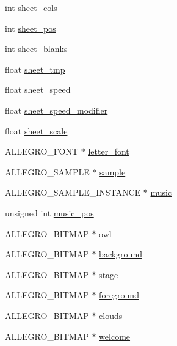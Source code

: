 \begin{DoxyCompactItemize}
\item 
int \hyperlink{structLevel_a8a5c443169a4ff15f330a65473eedb1b}{sheet\-\_\-cols}
\item 
int \hyperlink{structLevel_a21c699af201ffe60ccd1319b3f540947}{sheet\-\_\-pos}
\item 
int \hyperlink{structLevel_aebaaba311e5d4842fdbd8c50edd40808}{sheet\-\_\-blanks}
\item 
float \hyperlink{structLevel_a22e80ea91fd267dae85c0457e581d072}{sheet\-\_\-tmp}
\item 
float \hyperlink{structLevel_a41db1345ac158898450907010a49748f}{sheet\-\_\-speed}
\item 
float \hyperlink{structLevel_a3cae10fd441bcc14b6a47dd5fedafa59}{sheet\-\_\-speed\-\_\-modifier}
\item 
float \hyperlink{structLevel_a267a140bd3de1fc3f23a88623de425ed}{sheet\-\_\-scale}
\item 
A\-L\-L\-E\-G\-R\-O\-\_\-\-F\-O\-N\-T $\ast$ \hyperlink{structLevel_a69e6eae14648fd488a1dec0f55e4d293}{letter\-\_\-font}
\item 
A\-L\-L\-E\-G\-R\-O\-\_\-\-S\-A\-M\-P\-L\-E $\ast$ \hyperlink{structLevel_a234fa7b9ec35dd360e4e3c48a944fc7d}{sample}
\item 
A\-L\-L\-E\-G\-R\-O\-\_\-\-S\-A\-M\-P\-L\-E\-\_\-\-I\-N\-S\-T\-A\-N\-C\-E $\ast$ \hyperlink{structLevel_a41c6aae8f508e078b02c291e1d6f8e67}{music}
\item 
unsigned int \hyperlink{structLevel_a13e322deb3298846260af31324e5b492}{music\-\_\-pos}
\item 
A\-L\-L\-E\-G\-R\-O\-\_\-\-B\-I\-T\-M\-A\-P $\ast$ \hyperlink{structLevel_af504e3f628040bc2a2913a50253e856d}{owl}
\item 
A\-L\-L\-E\-G\-R\-O\-\_\-\-B\-I\-T\-M\-A\-P $\ast$ \hyperlink{structLevel_a4b4dd31284206502977b3d5b95d52abc}{background}
\item 
A\-L\-L\-E\-G\-R\-O\-\_\-\-B\-I\-T\-M\-A\-P $\ast$ \hyperlink{structLevel_ad412b858a4e688114dd89a44ecb005bb}{stage}
\item 
A\-L\-L\-E\-G\-R\-O\-\_\-\-B\-I\-T\-M\-A\-P $\ast$ \hyperlink{structLevel_a26c758ccdc7404a3ee0e766d1cbbf0be}{foreground}
\item 
A\-L\-L\-E\-G\-R\-O\-\_\-\-B\-I\-T\-M\-A\-P $\ast$ \hyperlink{structLevel_a27d34b57b66d4e7f733cb6a5cc16ff18}{clouds}
\item 
A\-L\-L\-E\-G\-R\-O\-\_\-\-B\-I\-T\-M\-A\-P $\ast$ \hyperlink{structLevel_a575fec7686bd94b5c35b15d73296c977}{welcome}
\item 

\end{DoxyCompactItemize}
